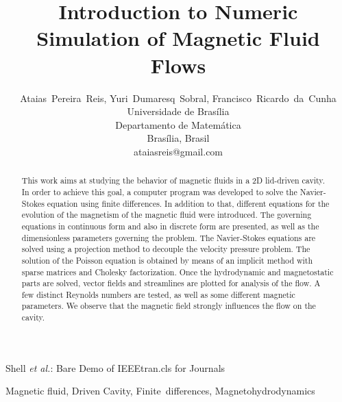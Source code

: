 \documentclass[journal]{IEEEtran}
\begin{document}
\title{Introduction to Numeric Simulation of Magnetic Fluid Flows}

\author{Ataias~Pereira~Reis, Yuri~Dumaresq~Sobral, Francisco~Ricardo~da~Cunha\\Universidade de Brasília\\Departamento de Matemática\\Brasília, Brasil\\ataiasreis@gmail.com}

%
{Shell \MakeLowercase{\textit{et al.}}: Bare Demo of IEEEtran.cls for Journals}

\maketitle


\begin{abstract}
This work aims at studying the behavior of magnetic fluids in a 2D lid-driven cavity. In order to achieve this goal, a computer program was developed to solve the Navier-Stokes equation using finite differences. In addition to that, different equations for the evolution of the magnetism of the magnetic fluid were introduced. The governing equations in continuous form and also in discrete form are presented, as well as the dimensionless parameters governing the problem. The Navier-Stokes equations are solved using a projection method to decouple the velocity pressure problem. The solution of the Poisson equation is obtained by means of an implicit method with sparse matrices and Cholesky factorization. Once the hydrodynamic and magnetostatic parts are solved, vector fields and streamlines are plotted for analysis of the flow. A few distinct Reynolds numbers are tested, as well as some different magnetic parameters. We observe that the magnetic field strongly influences the flow on the cavity.

\end{abstract}

\begin{IEEEkeywords}
Magnetic fluid, Driven Cavity, Finite~differences, Magnetohydrodynamics
\end{IEEEkeywords}
\end{document}
